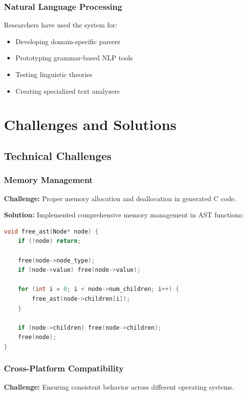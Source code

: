 \documentclass[a4paper,12pt]{report}
\begin{document}
\subsection{Natural Language Processing}
Researchers have used the system for:
\begin{itemize}
    \item Developing domain-specific parsers
    \item Prototyping grammar-based NLP tools
    \item Testing linguistic theories
    \item Creating specialized text analyzers
\end{itemize}

\newpage

\chapter{Challenges and Solutions}
\thispagestyle{contentpages}
\justifying

\section{Technical Challenges}

\subsection{Memory Management}
\textbf{Challenge:} Proper memory allocation and deallocation in generated C code.

\textbf{Solution:} Implemented comprehensive memory management in AST functions:
\begin{lstlisting}[language=C, caption=Memory Management Implementation]
void free_ast(Node* node) {
    if (!node) return;
    
    free(node->node_type);
    if (node->value) free(node->value);
    
    for (int i = 0; i < node->num_children; i++) {
        free_ast(node->children[i]);
    }
    
    if (node->children) free(node->children);
    free(node);
}
\end{lstlisting}

\subsection{Cross-Platform Compatibility}
\textbf{Challenge:} Ensuring consistent behavior across different operating systems.
\end{document}
